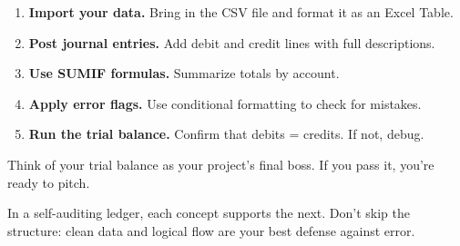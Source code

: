 \begin{enumerate}
\item \textbf{Import your data.} Bring in the CSV file and format it as an Excel Table.
\item \textbf{Post journal entries.} Add debit and credit lines with full descriptions.
\item \textbf{Use SUMIF formulas.} Summarize totals by account.
\item \textbf{Apply error flags.} Use conditional formatting to check for mistakes.
\item \textbf{Run the trial balance.} Confirm that debits = credits. If not, debug.
\end{enumerate}

\begin{Tip}
Think of your trial balance as your project’s final boss. If you pass it, you’re ready to pitch.
\end{Tip}

\begin{Important}
In a self-auditing ledger, each concept supports the next. Don’t skip the structure: clean data and logical flow are your best defense against error.
\end{Important}

\clearpage
